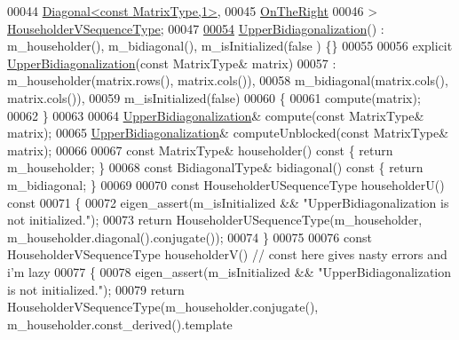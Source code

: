\begin{DoxyCode}
00044               \hyperlink{group___core___module_class_eigen_1_1_diagonal}{Diagonal<const MatrixType,1>},
00045               \hyperlink{group__enums_ggac22de43beeac7a78b384f99bed5cee0ba99dc75d8e00b6c3a5bdc31940f47492b}{OnTheRight}
00046             > \hyperlink{group___householder___module_class_eigen_1_1_householder_sequence}{HouseholderVSequenceType};
00047     
\hyperlink{class_eigen_1_1internal_1_1_upper_bidiagonalization_aa37a7ca5f5e86e3efbc6907d03d89340}{00054}     \hyperlink{class_eigen_1_1internal_1_1_upper_bidiagonalization_aa37a7ca5f5e86e3efbc6907d03d89340}{UpperBidiagonalization}() : m\_householder(), m\_bidiagonal(), m\_isInitialized(false
      ) \{\}
00055 
00056     \textcolor{keyword}{explicit} \hyperlink{class_eigen_1_1internal_1_1_upper_bidiagonalization_aa37a7ca5f5e86e3efbc6907d03d89340}{UpperBidiagonalization}(\textcolor{keyword}{const} MatrixType& matrix)
00057       : m\_householder(matrix.rows(), matrix.cols()),
00058         m\_bidiagonal(matrix.cols(), matrix.cols()),
00059         m\_isInitialized(\textcolor{keyword}{false})
00060     \{
00061       compute(matrix);
00062     \}
00063     
00064     \hyperlink{class_eigen_1_1internal_1_1_upper_bidiagonalization}{UpperBidiagonalization}& compute(\textcolor{keyword}{const} MatrixType& matrix);
00065     \hyperlink{class_eigen_1_1internal_1_1_upper_bidiagonalization}{UpperBidiagonalization}& computeUnblocked(\textcolor{keyword}{const} MatrixType& matrix);
00066     
00067     \textcolor{keyword}{const} MatrixType& householder()\textcolor{keyword}{ const }\{ \textcolor{keywordflow}{return} m\_householder; \}
00068     \textcolor{keyword}{const} BidiagonalType& bidiagonal()\textcolor{keyword}{ const }\{ \textcolor{keywordflow}{return} m\_bidiagonal; \}
00069     
00070     \textcolor{keyword}{const} HouseholderUSequenceType householderU()\textcolor{keyword}{ const}
00071 \textcolor{keyword}{    }\{
00072       eigen\_assert(m\_isInitialized && \textcolor{stringliteral}{"UpperBidiagonalization is not initialized."});
00073       \textcolor{keywordflow}{return} HouseholderUSequenceType(m\_householder, m\_householder.diagonal().conjugate());
00074     \}
00075 
00076     \textcolor{keyword}{const} HouseholderVSequenceType householderV() \textcolor{comment}{// const here gives nasty errors and i'm lazy}
00077     \{
00078       eigen\_assert(m\_isInitialized && \textcolor{stringliteral}{"UpperBidiagonalization is not initialized."});
00079       \textcolor{keywordflow}{return} HouseholderVSequenceType(m\_householder.conjugate(), m\_householder.const\_derived().template 

\end{DoxyCode}
